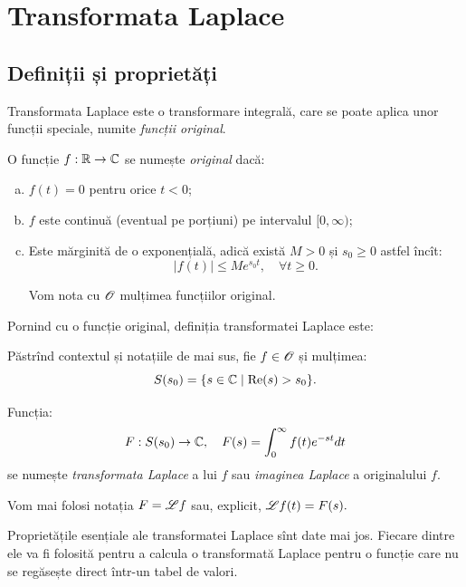 \chapter{Transformata Laplace}


\section{Definiții și proprietăți}

Transformata Laplace este o transformare integrală, care se poate aplica unor
funcții speciale, numite \emph{funcții original}.

\begin{definition}\label{def:orig}
  O funcție $ f : \mathbb{R} \to \mathbb{C} $ se numește \emph{original} dacă:
  \begin{enumerate}[(a)]
  \item $ f(t) = 0 $ pentru orice $ t < 0 $;
  \item $ f $ este continuă (eventual pe porțiuni) pe intervalul $ [0, \infty) $;
  \item Este mărginită de o exponențială, adică există $ M > 0 $ și $ s_0 \geq 0 $
    astfel încît:
    \[
      |f(t)| \leq Me^{s_0 t}, \quad \forall t \geq 0.
    \]

    Vom nota cu $ \mathscr{O} $ mulțimea funcțiilor original.
  \end{enumerate}
\end{definition}

Pornind cu o funcție original, definiția transformatei Laplace este:
\begin{definition}\label{def:lapl}
  Păstrînd contextul și notațiile de mai sus, fie $ f \in \mathscr{O} $ și
  mulțimea:
  \[
    S(s_0) = \{ s \in \mathbb{C} \mid \mathrm{Re}(s) > s_0 \}.
  \]

  Funcția:
  \[
    F : S(s_0) \to \mathbb{C}, \quad F(s) = \int_0^\infty f(t) e^{-st} dt
  \]
  se numește \emph{transformata Laplace} a lui $ f $ sau \emph{imaginea Laplace}
  a originalului $ f $.

  Vom mai folosi notația $ F = \mathscr{L} f $ sau, explicit, $ \mathscr{L} f(t) = F(s). $
\end{definition}

Proprietățile esențiale ale transformatei Laplace sînt date mai jos. Fiecare dintre ele
va fi folosită pentru a calcula o transformată Laplace pentru o funcție care nu se
regăsește direct într-un tabel de valori.

